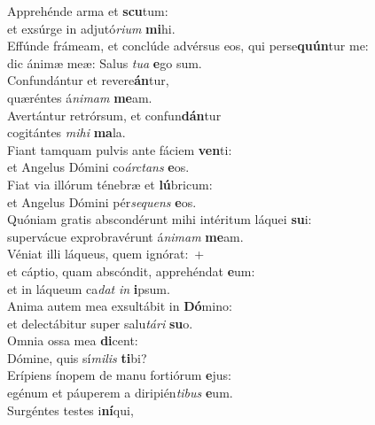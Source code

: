 \evenverse Apprehénde arma et \textbf{scu}tum:~\*\\
\evenverse et exsúrge in adjutó\textit{ri}\textit{um} \textbf{mi}hi.\\
\oddverse Effúnde frámeam, et conclúde advérsus eos, qui perse\textbf{quún}tur me:~\*\\
\oddverse dic ánimæ meæ: Salus \textit{tu}\textit{a} \textbf{e}go sum.\\
\evenverse Confundántur et revere\textbf{án}tur,~\*\\
\evenverse quæréntes á\textit{ni}\textit{mam} \textbf{me}am.\\
\oddverse Avertántur retrórsum, et confun\textbf{dán}tur~\*\\
\oddverse cogitántes \textit{mi}\textit{hi} \textbf{ma}la.\\
\evenverse Fiant tamquam pulvis ante fáciem \textbf{ven}ti:~\*\\
\evenverse et Angelus Dómini co\textit{ár}\textit{ctans} \textbf{e}os.\\
\oddverse Fiat via illórum ténebræ et \textbf{lú}bricum:~\*\\
\oddverse et Angelus Dómini pér\textit{se}\textit{quens} \textbf{e}os.\\
\evenverse Quóniam gratis abscondérunt mihi intéritum láquei \textbf{su}i:~\*\\
\evenverse supervácue exprobravérunt á\textit{ni}\textit{mam} \textbf{me}am.\\
\oddverse Véniat illi láqueus, quem ignórat:~+\\
\oddverse  et cáptio, quam abscóndit, apprehéndat \textbf{e}um:~\*\\
\oddverse et in láqueum ca\textit{dat} \textit{in} \textbf{i}psum.\\
\evenverse Anima autem mea exsultábit in \textbf{Dó}mino:~\*\\
\evenverse et delectábitur super salu\textit{tá}\textit{ri} \textbf{su}o.\\
\oddverse Omnia ossa mea \textbf{di}cent:~\*\\
\oddverse Dómine, quis sí\textit{mi}\textit{lis} \textbf{ti}bi?\\
\evenverse Erípiens ínopem de manu fortiórum \textbf{e}jus:~\*\\
\evenverse egénum et páuperem a diripién\textit{ti}\textit{bus} \textbf{e}um.\\
\oddverse Surgéntes testes i\textbf{ní}qui,~\*\\
